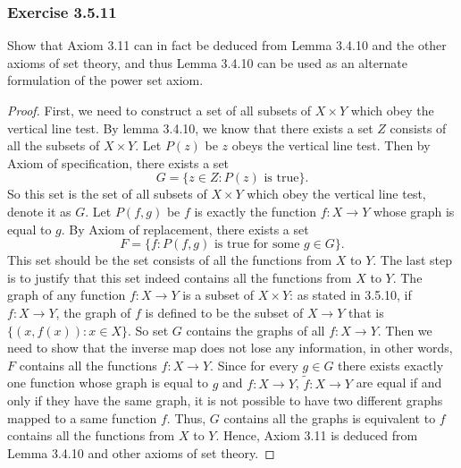\documentclass[12pt, letter]{article}
\begin{document}
\subsubsection*{Exercise 3.5.11}
Show that Axiom 3.11 can in fact be deduced from Lemma 3.4.10 and the other axioms of set theory, and thus Lemma 3.4.10 can be used as an 
alternate formulation of the power set axiom. 
\begin{proof}
    First, we need to construct a set of all subsets of $X\times Y$ which obey the vertical line test. By lemma 3.4.10, we know that there exists a set $Z$ consists of all the subsets of $X\times Y$. Let $P(z)$ be $z$ obeys the vertical line test. Then 
    by Axiom of specification, there exists a set
    \begin{equation*}
        G=\{z\in Z: P(z) \text{ is true}\}.
    \end{equation*}
    So this set is the set of all subsets of $X\times Y$ which obey the vertical line test, denote it as $G$. Let $P(f,g)$ be $f$ is exactly the function $f:X\to Y$ whose graph is equal to $g$. By Axiom of replacement, there exists a set 
    \begin{equation*}
        F=\{f:P(f,g)\text{ is true for some }g\in G\}.
    \end{equation*}
    This set should be the set consists of all the functions from $X$ to $Y$. The last step is to justify that this set indeed contains all the functions from $X$ to $Y$. The graph of any function $f: X\to Y$ is a subset of $X\times Y$: 
    as stated in 3.5.10, if $f:X\to Y$, the graph of $f$ is defined to be the subset of $X\to Y$ that is $\{(x,f(x)):x\in X\}$. So set $G$ contains the graphs of all $f:X\to Y$. Then we need to show that the inverse map does not lose any information, in other words,
    $F$ contains all the functions $f:X\to Y$. Since for every $g\in G$ there exists exactly one function whose graph is equal to $g$ and $f:X\to Y$, $\tilde{f}:X\to Y$ are equal if and only if they have the same graph, it is not possible to have two different graphs mapped 
    to a same function $f$. Thus, $G$ contains all the graphs is equivalent to $f$ contains all the functions from $X$ to $Y$. Hence, Axiom 3.11 is deduced from Lemma 3.4.10 and other axioms of set theory. 
\end{proof}
\end{document}
